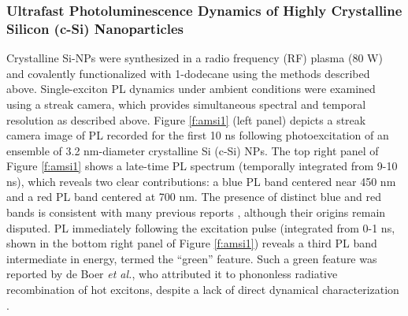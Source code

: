 \subsubsection{Ultrafast Photoluminescence Dynamics of Highly Crystalline Silicon (c-Si) Nanoparticles}
Crystalline Si-NPs were synthesized in a radio frequency (RF) plasma (80 W) and covalently functionalized with 1-dodecane using the methods described above. Single-exciton PL dynamics under ambient conditions were examined using a streak camera, which provides simultaneous spectral and temporal resolution as described above. Figure \ref{f:amsi1} (left panel) depicts a streak camera image of PL recorded for the first 10 ns following photoexcitation of an ensemble of 3.2 nm-diameter crystalline Si (c-Si) NPs. The top right panel of Figure \ref{f:amsi1} shows a late-time PL spectrum (temporally integrated from 9-10 ns), which reveals two clear contributions: a blue PL band centered near 450 nm and a red PL band centered at 700 nm. The presence of distinct blue and red bands is consistent with many previous reports \cite{PhysRevLett.100.067401,tsybeskov1994blue,valenta2008origin,yang1999synthesis,holmes2001highly}, although their origins remain disputed. PL immediately following the excitation pulse (integrated from 0-1 ns, shown in the bottom right panel of Figure \ref{f:amsi1}) reveals a third PL band intermediate in energy, termed the “green” feature. Such a green feature was reported by de Boer \emph{et al.}, who attributed it to phononless radiative recombination of hot excitons, despite a lack of direct dynamical characterization \cite{de2010red}. \par

